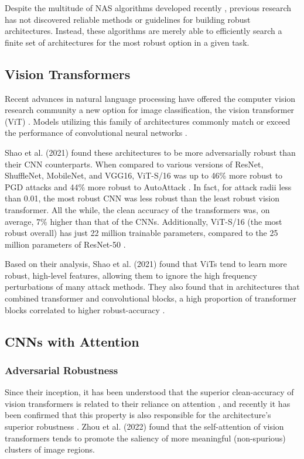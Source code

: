 \documentclass[10pt,twocolumn,letterpaper]{article}
\begin{document}
    Despite the multitude of NAS algorithms developed recently \cite{RACL}\cite{AdvRush}\cite{MORAS}\cite{DSRNA}, previous research has not discovered reliable methods or guidelines for building robust architectures. Instead, these algorithms are merely able to efficiently search a finite set of architectures for the most robust option in a given task.

  \subsection{Vision Transformers}
    Recent advances in natural language processing have offered the computer vision research community a new option for image classification, the vision transformer (ViT) \cite{VisionTransformerSurvey}. Models utilizing this family of architectures commonly match or exceed the performance of convolutional neural networks \cite{ViT}\cite{DeiT}\cite{PVT}\cite{Swin}.
    
    Shao et al. (2021) found these architectures to be more adversarially robust than their CNN counterparts. When compared to various versions of ResNet, ShuffleNet, MobileNet, and VGG16, ViT-S/16 was up to 46\% more robust to PGD attacks and 44\% more robust to AutoAttack \cite{RobustTransformers}. In fact, for attack radii less than 0.01, the most robust CNN was less robust than the least robust vision transformer. All the while, the clean accuracy of the transformers was, on average, 7\% higher than that of the CNNs. Additionally, ViT-S/16 (the most robust overall) has just 22 million trainable parameters, compared to the 25 million parameters of ResNet-50 \cite{ViT}\cite{ResNet}.

    Based on their analysis, Shao et al. (2021) found that ViTs tend to learn more robust, high-level features, allowing them to ignore the high frequency perturbations of many attack methods. They also found that in architectures that combined transformer and convolutional blocks, a high proportion of transformer blocks correlated to higher robust-accuracy \cite{RobustTransformers}.

  \subsection{CNNs with Attention}
    \subsubsection{Adversarial Robustness}
      Since their inception, it has been understood that the superior clean-accuracy of vision transformers is related to their reliance on attention \cite{VisionTransformerSurvey}, and recently it has been confirmed that this property is also responsible for the architecture's superior robustness \cite{UnderstandingTransformerRobustness}. Zhou et al. (2022) found that the self-attention of vision transformers tends to promote the saliency of more meaningful (non-spurious) clusters of image regions.
\end{document}
